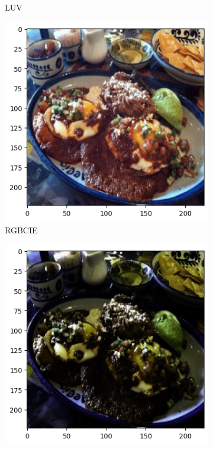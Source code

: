 \begin{figure}[htbp]
\begin{subfigure}[b]{0.22\textwidth}
    \caption{LUV}
    \label{fig:luv}
  \end{subfigure}
  \hfill
  \medskip
  \begin{subfigure}[b]{0.22\textwidth}
    \includegraphics[width=\textwidth]{graphics/images/colorspaces/rgbcie.png}
    \caption{RGBCIE}
    \label{fig:rgbcie}
  \end{subfigure}
  \hfill
  \begin{subfigure}[b]{0.22\textwidth}
    \includegraphics[width=\textwidth]{graphics/images/colorspaces/xyz.png}

\end{subfigure}
\end{figure}
